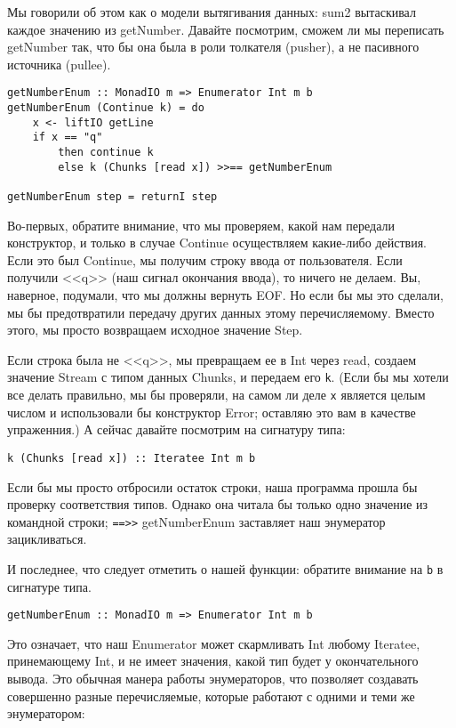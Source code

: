 Мы говорили об этом как о модели вытягивания данных: sum2 вытаскивал каждое значению из getNumber. Давайте посмотрим, сможем ли мы переписать getNumber так, что бы она была в роли толкателя (pusher), а не пасивного источника (pullee).

\begin{lstlisting}
getNumberEnum :: MonadIO m => Enumerator Int m b
getNumberEnum (Continue k) = do
    x <- liftIO getLine
    if x == "q"
        then continue k
        else k (Chunks [read x]) >>== getNumberEnum
        
getNumberEnum step = returnI step
\end{lstlisting}

Во-первых, обратите внимание, что мы проверяем, какой нам передали конструктор, и только в случае Continue осуществляем какие-либо действия. Если это был Continue, мы получим строку ввода от пользователя. Если получили <<q>> (наш сигнал окончания ввода), то ничего не делаем. Вы, наверное, подумали, что мы должны вернуть EOF. Но если бы мы это сделали, мы бы предотвратили передачу других данных этому перечисляемому. Вместо этого, мы просто возвращаем исходное значение Step.

Если строка была не <<q>>, мы превращаем ее в Int через read, создаем значение Stream с типом данных Chunks, и передаем его \lstinline'k'. (Если бы мы хотели все делать правильно, мы бы проверяли, на самом ли деле \lstinline'x' является целым числом и использовали бы конструктор Error; оставляю это вам в качестве упраженния.) А сейчас давайте посмотрим на сигнатуру типа:

\begin{lstlisting}
k (Chunks [read x]) :: Iteratee Int m b
\end{lstlisting}

Если бы мы просто отбросили остаток строки, наша программа прошла бы проверку соответствия типов. Однако она читала бы только одно значение из командной строки; \lstinline'==>>' getNumberEnum заставляет наш энумератор зацикливаться.

И последнее, что следует отметить о нашей функции: обратите внимание на \lstinline'b' в сигнатуре типа.

\begin{lstlisting}
getNumberEnum :: MonadIO m => Enumerator Int m b
\end{lstlisting}

Это означает, что наш Enumerator может скармливать Int любому Iteratee, принемающему Int, и не имеет значения, какой тип будет у окончательного вывода. Это обычная манера работы энумераторов, что позволяет создавать совершенно разные перечисляемые, которые работают с одними и теми же энумератором:

